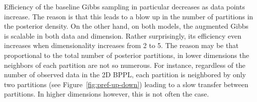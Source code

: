 Efficiency of the baseline Gibbs sampling in particular decreases as data points increase.
The reason is that this leads to a blow up in the number of partitions in the posterior density.
On the other hand, on both models, the augmented Gibbs is scalable in both data 
and dimension. 
Rather surprisingly, its efficiency even increases when dimensionality increases from 2 to 5.
The reason may be that proportional to the total number of posterior partitions, in lower dimensions the neighbors of each partition are not so numerous. 
For instance, regardless of the number of observed data in the 2D BPPL, each partition is neighbored by only two partitions (see Figure~\ref{fig:pref-up-down}) leading to a slow transfer between partitions. 
In higher dimensions however, this is not often the case.
